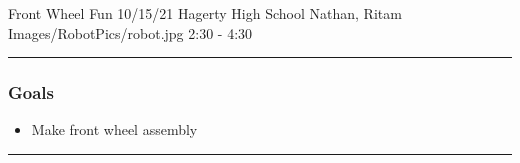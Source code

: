 \insertmeeting 
	{Front Wheel Fun} 
	{10/15/21}
	{Hagerty High School}
	{Nathan, Ritam}
	{Images/RobotPics/robot.jpg}
	{2:30 - 4:30}
	
\noindent\hfil\rule{\textwidth}{.4pt}\hfil
\subsubsection*{Goals}
\begin{itemize}
    \item Make front wheel assembly
 

\end{itemize} 

\noindent\hfil\rule{\textwidth}{.4pt}\hfil

